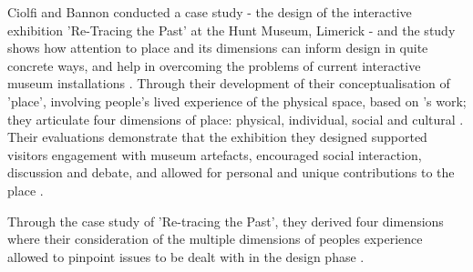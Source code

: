 Ciolfi and Bannon conducted a case study - the design of the interactive exhibition 'Re-Tracing the Past' at the Hunt Museum, Limerick - and the study shows how attention to place and its dimensions can inform design in quite concrete ways, and help in overcoming the problems of current interactive museum installations \autocite[p. 178]{hybridplace_ciolfi}. Through their development of their conceptualisation of 'place', involving people's lived experience of the physical space, based on \autocite{Tuan_book}'s work; they articulate four dimensions of place: physical, individual, social and cultural \autocite[p. 178]{hybridplace_ciolfi}. Their evaluations demonstrate that the exhibition they designed supported visitors engagement with museum artefacts, encouraged social interaction, discussion and debate, and allowed for personal and unique contributions to the place \autocite[p. 178]{hybridplace_ciolfi}.

\par
Through the case study of 'Re-tracing the Past', they derived four dimensions where their consideration of the multiple dimensions of peoples experience allowed to pinpoint issues to be dealt with in the design phase \autocite[p. 178]{hybridplace_ciolfi}.

